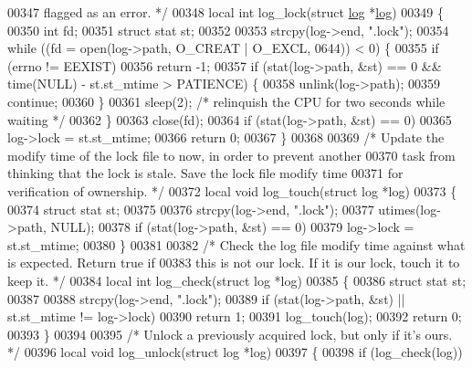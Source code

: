\begin{DoxyCode}
00347 \textcolor{comment}{   flagged as an error. */}
00348 local \textcolor{keywordtype}{int} log\_lock(\textcolor{keyword}{struct} \hyperlink{structlog}{log} *\hyperlink{structlog}{log})
00349 \{
00350     \textcolor{keywordtype}{int} fd;
00351     \textcolor{keyword}{struct }stat st;
00352 
00353     strcpy(log->end, \textcolor{stringliteral}{".lock"});
00354     \textcolor{keywordflow}{while} ((fd = open(log->path, O\_CREAT | O\_EXCL, 0644)) < 0) \{
00355         \textcolor{keywordflow}{if} (errno != EEXIST)
00356             \textcolor{keywordflow}{return} -1;
00357         \textcolor{keywordflow}{if} (stat(log->path, &st) == 0 && time(NULL) - st.st\_mtime > PATIENCE) \{
00358             unlink(log->path);
00359             \textcolor{keywordflow}{continue};
00360         \}
00361         sleep(2);       \textcolor{comment}{/* relinquish the CPU for two seconds while waiting */}
00362     \}
00363     close(fd);
00364     \textcolor{keywordflow}{if} (stat(log->path, &st) == 0)
00365         log->lock = st.st\_mtime;
00366     \textcolor{keywordflow}{return} 0;
00367 \}
00368 
00369 \textcolor{comment}{/* Update the modify time of the lock file to now, in order to prevent another}
00370 \textcolor{comment}{   task from thinking that the lock is stale.  Save the lock file modify time}
00371 \textcolor{comment}{   for verification of ownership. */}
00372 local \textcolor{keywordtype}{void} log\_touch(\textcolor{keyword}{struct} log *log)
00373 \{
00374     \textcolor{keyword}{struct }stat st;
00375 
00376     strcpy(log->end, \textcolor{stringliteral}{".lock"});
00377     utimes(log->path, NULL);
00378     \textcolor{keywordflow}{if} (stat(log->path, &st) == 0)
00379         log->lock = st.st\_mtime;
00380 \}
00381 
00382 \textcolor{comment}{/* Check the log file modify time against what is expected.  Return true if}
00383 \textcolor{comment}{   this is not our lock.  If it is our lock, touch it to keep it. */}
00384 local \textcolor{keywordtype}{int} log\_check(\textcolor{keyword}{struct} log *log)
00385 \{
00386     \textcolor{keyword}{struct }stat st;
00387 
00388     strcpy(log->end, \textcolor{stringliteral}{".lock"});
00389     \textcolor{keywordflow}{if} (stat(log->path, &st) || st.st\_mtime != log->lock)
00390         \textcolor{keywordflow}{return} 1;
00391     log\_touch(log);
00392     \textcolor{keywordflow}{return} 0;
00393 \}
00394 
00395 \textcolor{comment}{/* Unlock a previously acquired lock, but only if it's ours. */}
00396 local \textcolor{keywordtype}{void} log\_unlock(\textcolor{keyword}{struct} log *log)
00397 \{
00398     \textcolor{keywordflow}{if} (log\_check(log))

\end{DoxyCode}
